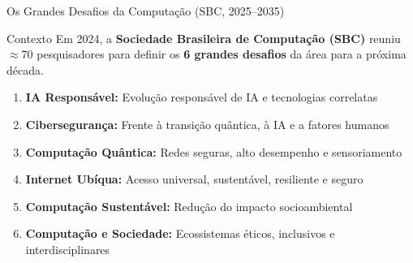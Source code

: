 \documentclass[aspectratio=169]{beamer}
\newcommand{\impt}[1]{\textcolor{morange}{\textbf{#1}}}
\begin{document}
\begin{frame}{Os Grandes Desafios da Computação (SBC, 2025--2035)}
  \begin{block}{Contexto}
    Em 2024, a \textbf{Sociedade Brasileira de Computação (SBC)} reuniu $\approx$70 pesquisadores para definir os \impt{6 grandes desafios} da área para a próxima década.
  \end{block}
  \vspace{0.3cm}
  \begin{enumerate}\setlength\itemsep{4pt}
    \item \colorbox{dsfai}{\parbox{0.85\textwidth}{\small \textbf{IA Responsável:} Evolução responsável de IA e tecnologias correlatas}}
    \item \colorbox{dsfcib}{\parbox{0.85\textwidth}{\small \textbf{Cibersegurança:} Frente à transição quântica, à IA e a fatores humanos}}
    \item \colorbox{dsfqua}{\parbox{0.85\textwidth}{\small \textbf{Computação Quântica:} Redes seguras, alto desempenho e sensoriamento}}
    \item \colorbox{dsfnet}{\parbox{0.85\textwidth}{\small \textbf{Internet Ubíqua:} Acesso universal, sustentável, resiliente e seguro}}
    \item \colorbox{dsfsus}{\parbox{0.85\textwidth}{\small \textbf{Computação Sustentável:} Redução do impacto socioambiental}}
    \item \colorbox{dsfsoc}{\parbox{0.85\textwidth}{\small \textbf{Computação e Sociedade:} Ecossistemas éticos, inclusivos e interdisciplinares}}
  \end{enumerate}
\end{frame}
\end{document}
